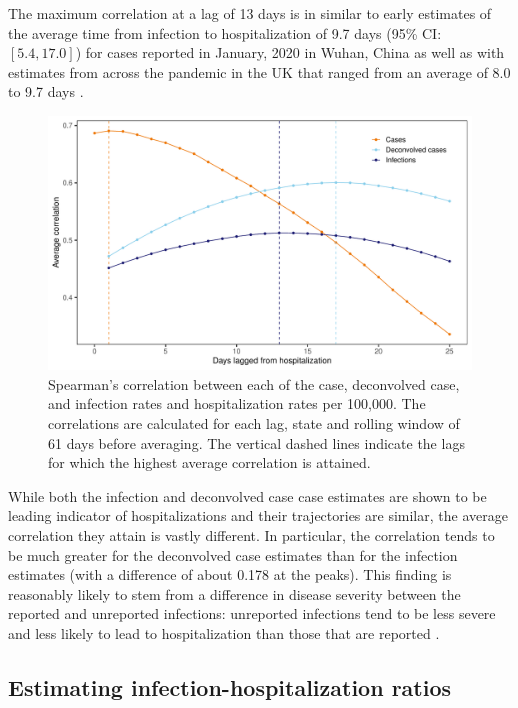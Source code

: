 \documentclass{article}
\begin{document}
The maximum correlation at a lag of 13 days is in similar to early estimates of the average time from
infection to hospitalization of 9.7 days (95\% CI: $[5.4, 17.0]$) for cases
reported in January, 2020 in Wuhan, China as well as with estimates from across
the pandemic in the UK that ranged from an average of 8.0 to 9.7 days
\citep{ward2021understanding}. 

\begin{figure}[!tb]
\centering
\includegraphics[width=0.99\linewidth]{adj_unadj_cases_hosp_lag_corr_F24.pdf} 
\caption{Spearman's correlation between each of the case, deconvolved case, and infection rates and
hospitalization rates per 100,000. The correlations are calculated for each
lag, state and rolling window of 61 days before averaging. 
The vertical dashed lines indicate the lags
for which the highest average correlation is attained.}
\label{fig:correlations}
\end{figure}

While both the infection and deconvolved case case estimates are shown to be 
leading indicator of hospitalizations and their trajectories are similar,
the average correlation they attain is vastly different.
In particular, the correlation tends to be much greater for the deconvolved case estimates than for
the infection estimates (with a difference of about 0.178 at the peaks). This finding is reasonably likely to
stem from a difference in disease severity between the reported and unreported
infections: unreported infections tend to be less severe and less likely to
lead to hospitalization than those that are reported \citep{sallahi2021using}.




\subsection{Estimating infection-hospitalization ratios}
\label{sec:ihrs}
\end{document}
